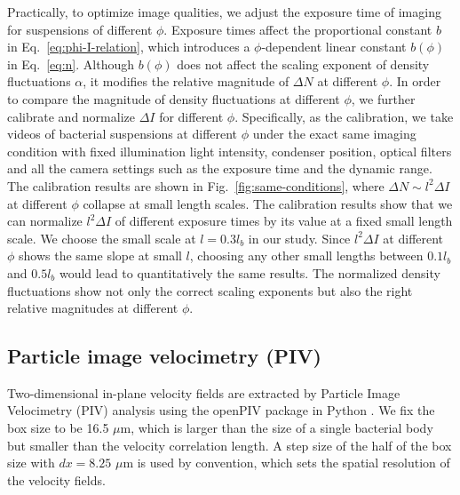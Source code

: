 \documentclass[twocolumn,aps,prx,amsmath,amssymb,longbibliography,superscriptaddress]{revtex4-2}
\begin{document}
Practically, to optimize image qualities, we adjust the exposure time of imaging for suspensions of different $\phi$. Exposure times affect the proportional constant $b$ in Eq.~\ref{eq:phi-I-relation}, which introduces a $\phi$-dependent linear constant $b(\phi)$ in Eq.~\ref{eq:n}. Although $b(\phi)$ does not affect the scaling exponent of density fluctuations $\alpha$, it modifies the relative magnitude of $\Delta N$ at different $\phi$. In order to compare the magnitude of density fluctuations at different $\phi$,  we further calibrate and normalize $\Delta I$ for different $\phi$. Specifically, as the calibration, we take videos of bacterial suspensions at different $\phi$ under the exact same imaging condition with fixed illumination light intensity, condenser position, optical filters and all the camera settings such as the exposure time and the dynamic range. The calibration results are shown in Fig.~\ref{fig:same-conditions}, where $\Delta N \sim l^2 \Delta I$ at different $\phi$ collapse at small length scales. The calibration results show that we can normalize $l^2 \Delta I$ of different exposure times by its value at a fixed small length scale. We choose the small scale at $l = 0.3l_b$ in our study. Since $l^2 \Delta I$ at different $\phi$ shows the same slope at small $l$, choosing any other small lengths between $0.1l_b$ and $0.5l_b$ would lead to quantitatively the same results. The normalized density fluctuations show not only the correct scaling exponents but also the right relative magnitudes at different $\phi$.


\subsection{Particle image velocimetry (PIV)} \label{appendix-IA-PIV}

Two-dimensional in-plane velocity fields are extracted by Particle Image Velocimetry (PIV) analysis using the openPIV package in Python \cite{Liberzon2020}. We fix the box size to be 16.5 $\mu$m, which is larger than the size of a single bacterial body but smaller than the velocity correlation length. A step size of the half of the box size with $dx = 8.25$ $\mu$m is used by convention, which sets the spatial resolution of the velocity fields.
\end{document}
